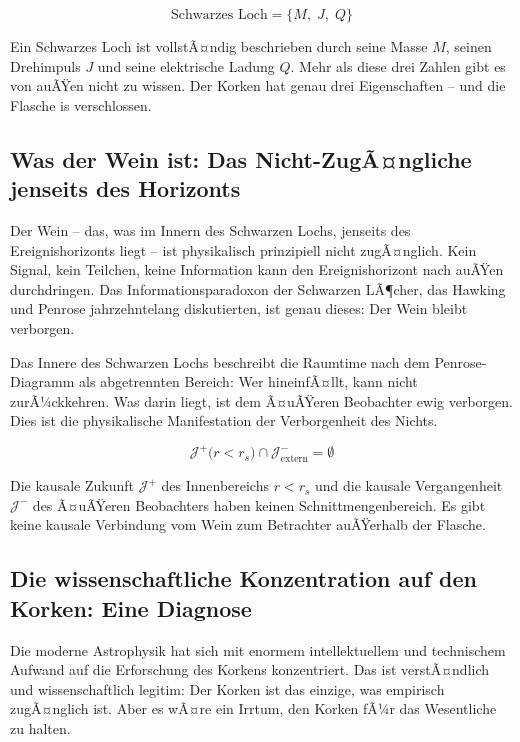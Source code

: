 ﻿\documentclass[12pt,a4paper]{report}
\begin{document}
\begin{equation}
	\text{Schwarzes Loch} = \bigl\{M,\; J,\; Q\bigr\}
	\label{eq:no_hair}
\end{equation}

Ein Schwarzes Loch ist vollstÃ¤ndig beschrieben durch seine Masse $M$, seinen Drehimpuls $J$ und seine elektrische Ladung $Q$. Mehr als diese drei Zahlen gibt es von auÃŸen nicht zu wissen. Der Korken hat genau drei Eigenschaften -- und die Flasche is verschlossen.

\subsection{Was der Wein ist: Das Nicht-ZugÃ¤ngliche jenseits des Horizonts}

Der Wein -- das, was im Innern des Schwarzen Lochs, jenseits des Ereignishorizonts liegt -- ist physikalisch prinzipiell nicht zugÃ¤nglich. Kein Signal, kein Teilchen, keine Information kann den Ereignishorizont nach auÃŸen durchdringen. Das Informationsparadoxon der Schwarzen LÃ¶cher, das Hawking und Penrose jahrzehntelang diskutierten, ist genau dieses: Der Wein bleibt verborgen.

Das Innere des Schwarzen Lochs beschreibt die Raumtime nach dem Penrose-Diagramm als abgetrennten Bereich: Wer hineinfÃ¤llt, kann nicht zurÃ¼ckkehren. Was darin liegt, ist dem Ã¤uÃŸeren Beobachter ewig verborgen. Dies ist die physikalische Manifestation der Verborgenheit des Nichts.

\begin{equation}
	\mathcal{J}^+\!\bigl(r < r_s\bigr) \cap \mathcal{J}^-_{\text{extern}} = \emptyset
	\label{eq:no_signal}
\end{equation}

Die kausale Zukunft $\mathcal{J}^+$ des Innenbereichs $r < r_s$ und die kausale Vergangenheit $\mathcal{J}^-$ des Ã¤uÃŸeren Beobachters haben keinen Schnittmengenbereich. Es gibt keine kausale Verbindung vom Wein zum Betrachter auÃŸerhalb der Flasche.

\subsection{Die wissenschaftliche Konzentration auf den Korken: Eine Diagnose}

Die moderne Astrophysik hat sich mit enormem intellektuellem und technischem Aufwand auf die Erforschung des Korkens konzentriert. Das ist verstÃ¤ndlich und wissenschaftlich legitim: Der Korken ist das einzige, was empirisch zugÃ¤nglich ist. Aber es wÃ¤re ein Irrtum, den Korken fÃ¼r das Wesentliche zu halten.
\end{document}
